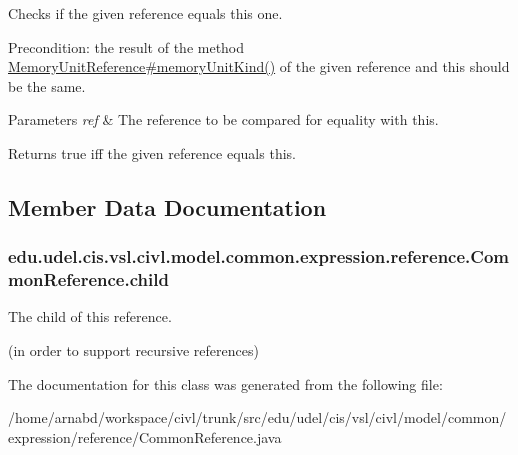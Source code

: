 Checks if the given reference equals this one. 

Precondition\+: the result of the method \hyperlink{interfaceedu_1_1udel_1_1cis_1_1vsl_1_1civl_1_1model_1_1IF_1_1expression_1_1reference_1_1MemoryUnitReference_a5317b115e431d5ecbfb203fb650b2318}{Memory\+Unit\+Reference\#memory\+Unit\+Kind()} of the given reference and this should be the same.


\begin{DoxyParams}{Parameters}
{\em ref} & The reference to be compared for equality with this. \\
\hline
\end{DoxyParams}
\begin{DoxyReturn}{Returns}
true iff the given reference equals this. 
\end{DoxyReturn}


\subsection{Member Data Documentation}
\hypertarget{classedu_1_1udel_1_1cis_1_1vsl_1_1civl_1_1model_1_1common_1_1expression_1_1reference_1_1CommonReference_a32b580fa84654a7581644054dd9a7fa7}{}
\subsubsection[{child}]{ edu.\+udel.\+cis.\+vsl.\+civl.\+model.\+common.\+expression.\+reference.\+Common\+Reference.\+child\hspace{0.3cm}{\ttfamily [protected]}}\label{classedu_1_1udel_1_1cis_1_1vsl_1_1civl_1_1model_1_1common_1_1expression_1_1reference_1_1CommonReference_a32b580fa84654a7581644054dd9a7fa7}


The child of this reference. 

(in order to support recursive references) 

The documentation for this class was generated from the following file\+:\begin{DoxyCompactItemize}
\item 
/home/arnabd/workspace/civl/trunk/src/edu/udel/cis/vsl/civl/model/common/expression/reference/Common\+Reference.\+java\end{DoxyCompactItemize}

